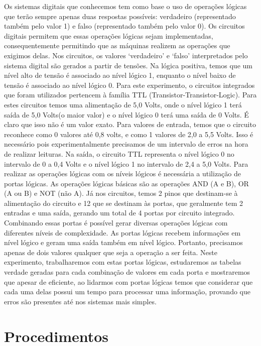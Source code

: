 \documentclass[12pt]{article}
\begin{document}
	Os sistemas digitais que conhecemos tem como base o uso de operações lógicas que terão sempre apenas duas respostas possíveis: verdadeiro (representado também pelo valor 1) e falso (representado também pelo valor 0). Os circuitos digitais permitem que essas operações lógicas sejam implementadas, consequentemente permitindo que as máquinas realizem as operações que exigimos delas.
	Nos circuitos, os valores ‘verdadeiro’ e ‘falso’ interpretados pelo sistema digital são gerados a partir de tensões. Na lógica positiva, temos que um nível alto de tensão é associado ao nível lógico 1, enquanto o nível baixo de tensão é associado ao nível lógico 0.
	Para este experimento, o circuitos integrados que foram utilizados pertencem à família TTL (Transistor-Transistor-Logic). Para estes circuitos temos uma alimentação de 5,0 Volts, onde o nível lógico 1 terá saída de 5,0 Volts(o maior valor) e o nível lógico 0 terá uma saída de 0 Volts. É claro que isso não é um valor exato. Para valores de entrada, temos que o circuito reconhece como 0 valores até 0,8 volts, e como 1 valores de 2,0 a 5,5 Volts. Isso é necessário pois experimentalmente precisamos de um intervalo de erros na hora de realizar leituras. Na saída, o circuito TTL representa o nível lógico 0 no intervalo de 0 a 0,4 Volts e o nível lógico 1 no intervalo de 2,4 a 5,0 Volts.
	Para realizar as operações lógicas com os níveis lógicos é necessária a utilização de portas lógicas. As operações lógicas básicas são as operações AND (A e B), OR (A ou B) e NOT (não A). Já nos circuitos, temos 2 pinos que destinam-se à alimentação do circuito e 12 que se destinam às portas, que geralmente tem 2 entradas e uma saída, gerando um total de 4 portas por circuito integrado. Combinando essas portas é possível gerar diversas operações lógicas com diferentes níveis de complexidade. As portas lógicas recebem informações em nível lógico e geram uma saída também em nível lógico. Portanto, precisamos apenas de dois valores qualquer que seja a operação a ser feita.
	Neste experimento, trabalharemos com estas portas lógicas, estudaremos as tabelas verdade geradas para cada combinação de valores em cada porta e mostraremos que apesar de eficiente, ao lidarmos com portas lógicas temos que considerar que cada uma delas possui um tempo para processar uma informação, provando que erros são presentes até nos sistemas mais simples.


\section{Procedimentos}
\label{sec:Procedimentos}
\end{document}
